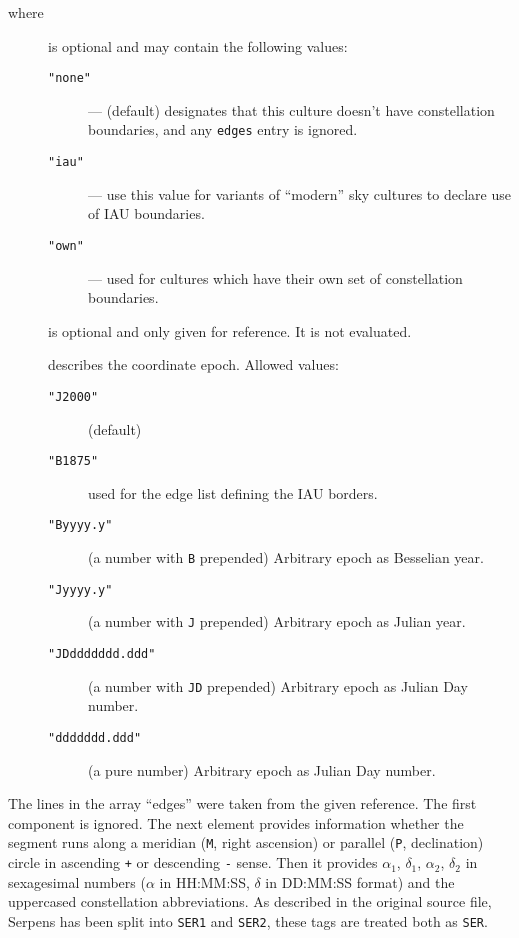 where
\begin{description}
\item[] is optional and may contain the following values:
  \begin{description}
  \item[\texttt{"none"}] --- (default) designates that this culture doesn't have constellation boundaries, and any \texttt{edges} entry is ignored.
  \item[\texttt{"iau"}] --- use this value for variants of ``modern'' sky cultures to declare use of IAU boundaries.
  \item[\texttt{"own"}] --- used for cultures which have their own set of constellation boundaries.
  \end{description}

\item[] is optional and only given for reference. It is not evaluated.

\item[] describes the coordinate epoch. Allowed values: 
  \begin{description}
  \item[\texttt{"J2000"}] (default)
  \item[\texttt{"B1875"}] used for the edge list defining the IAU borders.
  \item[\texttt{"Byyyy.y"}] (a number with \texttt{B} prepended) Arbitrary epoch as Besselian year.
  \item[\texttt{"Jyyyy.y"}] (a number with \texttt{J} prepended) Arbitrary epoch as Julian year.
  \item[\texttt{"JDddddddd.ddd"}] (a number with \texttt{JD} prepended) Arbitrary epoch as Julian Day number.
  \item[\texttt{"ddddddd.ddd"}] (a pure number) Arbitrary epoch as Julian Day number.
  \end{description}
\end{description}

The lines in the array ``edges'' were taken from the given reference. The first component is ignored. 
The next element provides information whether the segment runs along a meridian (\texttt{M}, right ascension) or 
parallel (\texttt{P}, declination) circle in ascending \texttt{+} or descending \texttt{-} sense.  
Then it provides $\alpha_1$, $\delta_1$, $\alpha_2$, $\delta_2$ in sexagesimal numbers ($\alpha$ in HH:MM:SS, $\delta$ in DD:MM:SS format)
and the uppercased constellation abbreviations. As described in the original source file, 
Serpens has been split into \texttt{SER1} and \texttt{SER2}, these tags are treated both as \texttt{SER}.

